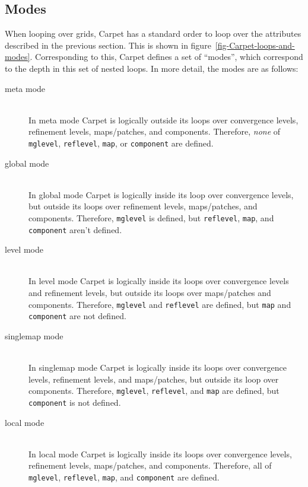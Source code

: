 \documentclass{article}
\begin{document}

\subsection{Modes}

When looping over grids, Carpet has a standard order to loop over
the attributes described in the previous section.  This is shown in
figure~\ref{fig-Carpet-loops-and-modes}.  Corresponding to this,
Carpet defines a set of ``modes'', which correspond to the depth in this
set of nested loops.  In more detail, the modes are as follows:
\begin{description}
\item[meta mode]%
\mbox{}\\
	In meta mode Carpet is logically outside its loops over
	convergence levels, refinement levels, maps/patches, and
	components.  Therefore, \emph{none} of \texttt{mglevel},
	\texttt{reflevel}, \texttt{map}, or \texttt{component} are defined.
\item[global mode]%
\mbox{}\\
	In global mode Carpet is logically inside its loop over
 	convergence levels, but outside its loops over refinement levels,
	maps/patches, and components.  Therefore, \texttt{mglevel}
	is defined, but \texttt{reflevel}, \texttt{map}, and
	\texttt{component} aren't defined.
\item[level mode]%
\mbox{}\\
	In level mode Carpet is logically inside its loops over
	convergence levels and refinement levels, but outside its
	loops over maps/patches and components.  Therefore,
	\texttt{mglevel} and \texttt{reflevel} are defined,
	but \texttt{map} and \texttt{component} are not defined.
\item[singlemap mode]%
\mbox{}\\
	In singlemap mode Carpet is logically inside its loops over
	convergence levels, refinement levels, and maps/patches, but
	outside its loop over components.  Therefore, \texttt{mglevel},
	\texttt{reflevel}, and \texttt{map} are defined,
	but \texttt{component} is not defined.
\item[local mode]%
\mbox{}\\
	In local mode Carpet is logically inside its loops over
	convergence levels, refinement levels, maps/patches, and
	components.  Therefore, all of \texttt{mglevel},
	\texttt{reflevel}, \texttt{map}, and \texttt{component}
	are defined.
\end{description}
\end{document}
